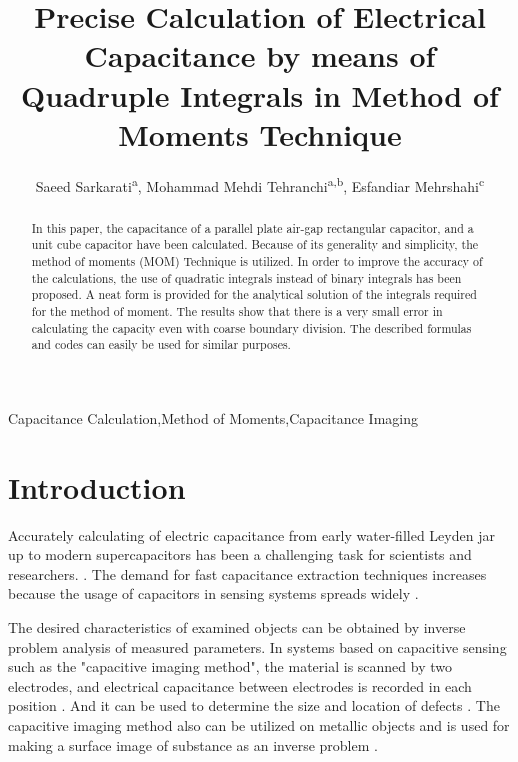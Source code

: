 \documentclass[final,5p,times,twocolumn]{elsarticle}
\begin{document}
\begin{frontmatter}

\title{Precise Calculation of Electrical Capacitance by means of Quadruple Integrals in  Method of Moments Technique}



\author{Saeed Sarkarati\textsuperscript{a}, Mohammad Mehdi Tehranchi\textsuperscript{a,b}, Esfandiar Mehrshahi\textsuperscript{c}}
\address{\textsuperscript{a}Laser and Plasma Research Institute, Shahid Beheshti University, Tehran, Iran}
\address{\textsuperscript{b}Department of Physics , Shahid Beheshti University, Tehran, Iran}
\address{\textsuperscript{c}Department of Electrical Engineering, Shahid Beheshti University, Tehran, Iran}




\begin{abstract}
In this paper, the capacitance of a parallel plate air-gap rectangular capacitor, and a unit cube capacitor have been calculated. Because of its generality and simplicity, the method of moments (MOM) Technique is utilized. In order to improve the accuracy of the calculations, the use of quadratic integrals instead of binary integrals has been proposed. A neat form is provided for the analytical solution of the integrals required for the method of moment. The results show that there is a very small error in calculating the capacity even with coarse boundary division. The described formulas and codes can easily be used for similar purposes.
\end{abstract}

\begin{keyword}
Capacitance Calculation\sep Method of Moments\sep Capacitance Imaging

\end{keyword}

\end{frontmatter}


\section{Introduction}

Accurately calculating of electric capacitance from early water-filled Leyden jar up to modern supercapacitors has been a challenging task for scientists and researchers. \cite{Dubal2016}. The demand for fast capacitance extraction techniques increases because the usage of capacitors in sensing systems spreads widely \cite{Rahman2009}.

The desired characteristics of examined objects can be obtained by inverse problem analysis of measured parameters. In systems based on capacitive sensing such as the "capacitive imaging method", the material is scanned by two electrodes, and electrical capacitance between electrodes is recorded in each position \cite{Diamond2006, Ma2020}. And it can be used to determine the size and location of defects \cite{Liu2017}. The capacitive imaging method also can be utilized on metallic objects and is used for making a surface image of substance as an inverse problem \cite{Muttakin2018}.
\end{document}

